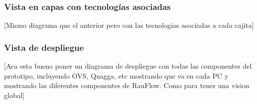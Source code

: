 \subsubsection[Vista en capas con tecnolog\'ias asociadas]{Vista en capas con tecnolog\'ias asociadas}

[Mismo diagrama que el anterior pero con las tecnologias asociadas a cada cajita]

\subsubsection[Vista de despliegue]{Vista de despliegue}

[Aca esta bueno poner un diagrama de despliegue con todas las componentes del prototipo, incluyendo OVS, Quagga, etc mostrando que va en cada PC y mostrando las diferentes componentes de RauFlow. Como para tener una vision global]



